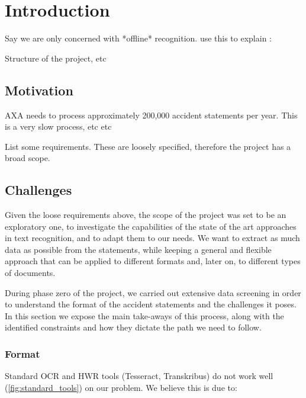 
\chapter{Introduction} %

\label{ch:intro}


Say we are only concerned with *offline* recognition. use this to explain : %



Structure of the project, etc


\section{Motivation}
AXA needs to process approximately 200,000 accident statements per year. This is a very slow process, etc etc

List some requirements. These are loosely specified, therefore the project has a broad scope.

\section{Challenges}\label{sec:challenges}
Given the loose requirements above, the scope of the project was set to be an exploratory one, to investigate the capabilities of the state of the art approaches in text recognition, and to adapt them to our needs. We want to extract as much data as possible from the statements, while keeping a general and flexible approach that can be applied to different formats and, later on, to different types of documents.

During phase zero of the project, we carried out extensive data screening in order to understand the format of the accident statements and the challenges it poses. In this section we expose the main take-aways of this process, along with the identified constraints and how they dictate the path we need to follow.


\subsection{Format}
	Standard OCR and HWR tools (Tesseract, Transkribus) do not work well (\autoref{fig:standard_tools}) on our problem. We believe this is due to:

